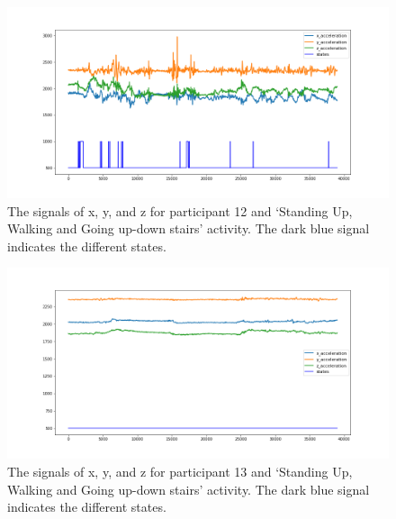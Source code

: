 \begin{figure}[H]
    \centering
    \begin{minipage}[b]{1\textwidth}
        \includegraphics[width=\textwidth]{manuscript/src/figures/Ass3/Ass3_Q2_states_user_11.png}
    \end{minipage}
    \caption{The signals of x, y, and z for participant 12 and ‘Standing  Up,  Walking  and  Going  up-down  stairs’ activity. The dark blue signal indicates the different states.}
    \label{fig:Ass3_Q2_states_user_11}
\end{figure}
\begin{figure}[H]
    \centering
    \begin{minipage}[b]{1\textwidth}
        \includegraphics[width=\textwidth]{manuscript/src/figures/Ass3/Ass3_Q2_states_user_12.png}
    \end{minipage}
    \caption{The signals of x, y, and z for participant 13 and ‘Standing  Up,  Walking  and  Going  up-down  stairs’ activity. The dark blue signal indicates the different states.}
    \label{fig:Ass3_Q2_states_user_12}
\end{figure}
